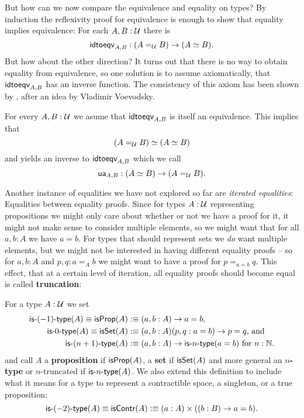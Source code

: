But how can we now compare the equivalence and equality on types?
By induction the reflexivity proof for equivalence is enough to show that
equality implies equivalence:
For each $A, B : \mathcal{U}$ there is
\begin{equation*}
\mathsf{idtoeqv}_{A, B} : (A =_{\mathcal{U}} B) \to (A \simeq B) \text{.}
\end{equation*}
But how about the other direction?
It turns out that there is no way to obtain equality from equivalence,
so one solution
is to assume axiomatically, that $\mathsf{idtoeqv}_{A, B}$ has an inverse function.
The consistency of this axiom has been shown by \cite{kapulkinlumsdaine},
after an idea by Vladimir Voevodsky.
\begin{axiom}[Univalence]
For every $A, B: \mathcal{U}$ we asume that
$\mathsf{idtoeqv}_{A, B}$ is itself an equivalence.
This implies that
\begin{equation*}
(A =_{\mathcal{U}} B) \simeq (A \simeq B)
\end{equation*}
and yields an inverse to $\mathsf{idtoeqv}_{A, B}$ which we call
\begin{equation*}
\mathsf{ua}_{A, B} : (A \simeq B) \to (A =_{\mathcal{U}} B) \text{.}
\end{equation*}
\end{axiom}

Another instance of equalities we have not explored so far are \emph{iterated equalities}:
Equalities between equality proofs.
Since for types $A : \mathcal{U}$ representing propositions we might only care about whether
or not we have a proof for it, it might not make sense to
consider multiple elements, so we might want that for all $a, b : A$ we have $a = b$.
For types that should represent sets we \emph{do} want multiple elements, but
we might not be interested in having different equality proofs --
so for $a, b : A$ and $p, q : a =_A b$ we might want to have a proof for $p =_{a = b} q$.
This effect, that at a certain level of iteration, all equality proofs should become
equal is called \textbf{truncation}:
\begin{defn}[$n$-types]
For a type $A : \mathcal{U}$ we set
\begin{align*}
\mathsf{is}\mbox{-}{(-1)}\mbox{-}\mathsf{type}{(A)} \equiv \mathsf{isProp}(A) &:\equiv (a, b : A) \to a = b \text{,} \\
\mathsf{is}\mbox{-}{0}\mbox{-}\mathsf{type}{(A)} \equiv \mathsf{isSet}(A)  &:\equiv (a, b : A)(p, q : a = b) \to p = q \text{, and} \\
\mathsf{is}\mbox{-}{(n + 1)}\mbox{-}\mathsf{type}{(A)} &:\equiv (a, b : A) \to \mathsf{is}\mbox{-}{n}\mbox{-}\mathsf{type}{(a = b)} \text{ for $n : \mathbb{N}$.}
\end{align*}
and call $A$ a \textbf{proposition} if $\mathsf{isProp}(A)$, a \textbf{set} if $\mathsf{isSet}(A)$ and more
general an
\textbf{$n$-type} or $n$-truncated if $\mathsf{is}\mbox{-}{n}\mbox{-}\mathsf{type}{(A)}$.
We also extend this definition to include what it means for a type to represent a
contractible space, a singleton, or a true proposition:
\begin{equation*}
\mathsf{is}\mbox{-}{(-2)}\mbox{-}\mathsf{type}{(A)} \equiv \mathsf{isContr}(A) :\equiv (a : A) \times ((b : B) \to a = b) \text{.}
\end{equation*}
\end{defn}

